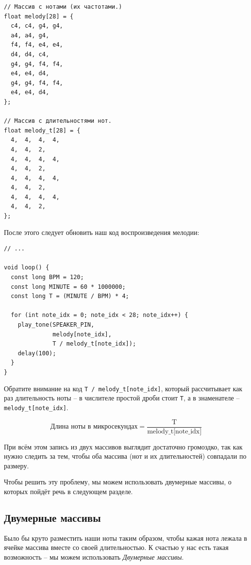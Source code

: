 \documentclass[a4paper,twoside]{book}
\begin{document}
\begin{verbatim}
// Массив с нотами (их частотами.)
float melody[28] = {
  c4, c4, g4, g4,
  a4, a4, g4,
  f4, f4, e4, e4,
  d4, d4, c4,
  g4, g4, f4, f4,
  e4, e4, d4,
  g4, g4, f4, f4,
  e4, e4, d4,
};

// Массив с длительностями нот.
float melody_t[28] = {
  4,  4,  4,  4,
  4,  4,  2,
  4,  4,  4,  4,
  4,  4,  2,
  4,  4,  4,  4,
  4,  4,  2,
  4,  4,  4,  4,
  4,  4,  2,
};
\end{verbatim}

После этого следует обновить наш код воспроизведения мелодии:

\begin{verbatim}
// ...

void loop() {
  const long BPM = 120;
  const long MINUTE = 60 * 1000000;
  const long T = (MINUTE / BPM) * 4;

  for (int note_idx = 0; note_idx < 28; note_idx++) {
    play_tone(SPEAKER_PIN,
              melody[note_idx],
              T / melody_t[note_idx]);
    delay(100);
  }
}
\end{verbatim}

Обратите внимание на код \texttt{T / melody\_t[note\_idx]}, который рассчитывает
как раз длительность ноты -- в числителе простой дроби стоит \texttt{T}, а в
знаменателе -- \texttt{melody\_t[note\_idx]}.

\begin{equation}
  \mbox{Длина ноты в микросекундах} = \frac{\mbox{T}}{\mbox{melody\_t[note\_idx]}}
\end{equation}

При всём этом запись из двух массивов выглядит достаточно громоздко, так как
нужно следить за тем, чтобы оба массива (нот и их длительностей) совпадали по
размеру.

Чтобы решить эту проблему, мы можем использовать двумерные массивы, о которых
пойдёт речь в следующем разделе.

\newpage
\subsection{Двумерные массивы}

Было бы круто разместить наши ноты таким образом, чтобы кажая нота лежала в
ячейке массива вместе со своей длительностью. К счастью у нас есть такая
возможность -- мы можем использовать \emph{Двумерные массивы}.
\end{document}
